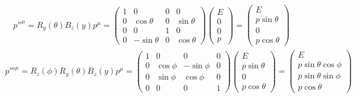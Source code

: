 \documentclass[11pt]{article}
\begin{document}
\begin{eqnarray}
    {p{''}}^\mu = R_y(\theta)B_z(y) p^\mu =
    \begin{pmatrix}
        1 & 0 & 0 & 0 \\
        0 &\cos\theta & 0 &\sin\theta \\
        0 & 0 & 1 & 0\\
        0 &-\sin\theta & 0 & \cos\theta
    \end{pmatrix}
    \begin{pmatrix}
        E \\ 0 \\ 0 \\ p
    \end{pmatrix} 
    =
    \begin{pmatrix}
      E \\ p \sin\theta \\ 0 \\ p\cos\theta
    \end{pmatrix} 
\end{eqnarray}
\begin{eqnarray}
    {p{'''}}^\mu = R_z(\phi)R_y(\theta)B_z(y) p^\mu =
    \begin{pmatrix}
     1 & 0 & 0 & 0\\
     0 & \cos\phi & -\sin\phi & 0 \\
     0 & \sin\phi & \cos\phi & 0 \\
     0 & 0 & 0 & 1
    \end{pmatrix}
    \begin{pmatrix}
        E \\ p \sin\theta \\ 0 \\ p\cos\theta
      \end{pmatrix} 
      =
    \begin{pmatrix}
      E \\ p\sin\theta\cos\phi \\ p\sin\theta\sin\phi \\ p\cos\theta
    \end{pmatrix}
\end{eqnarray}
\end{document}
